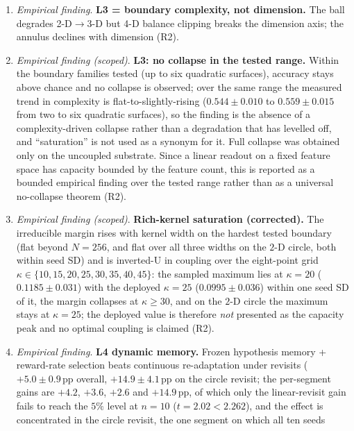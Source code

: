 \documentclass[preprint,12pt]{elsarticle}
\begin{document}
\begin{enumerate}[label=\arabic*.]
\texttt{data/s53\_auto\_basis\_v1.json} (top-$50$ PCA ridge on raw block-mean
features, $240$-block windows refitted every $20$ blocks, $\lambda=1.0$,
$n=2550$ readings per substrate over $10$ seeds and three arms), which closes
the traceability gap between that number and the script that produces it.
\item \emph{Empirical finding}. \textbf{L3 = boundary complexity, not dimension.} The ball degrades
2-D$\to$3-D but 4-D balance clipping breaks the dimension axis; the annulus
declines with dimension (R2).
\item \emph{Empirical finding (scoped)}. \textbf{L3: no collapse in the tested range.}
Within the boundary families tested (up to six quadratic surfaces),
accuracy stays above chance and no collapse is observed; over the same range
the measured trend in complexity is flat-to-slightly-rising ($0.544\pm0.010$
to $0.559\pm0.015$ from two to six quadratic surfaces), so the finding is the
absence of a complexity-driven collapse rather than a degradation that has
levelled off, and ``saturation'' is not used as a synonym for it. Full collapse
was obtained only on the uncoupled substrate. Since a linear readout on a
fixed feature space has capacity bounded by the feature count, this is
reported as a bounded empirical finding over the tested range rather than as
a universal no-collapse theorem (R2).
\item \emph{Empirical finding (scoped)}. \textbf{Rich-kernel saturation (corrected).} The irreducible margin
rises with kernel width on the hardest tested boundary (flat beyond
$N=256$, and flat over all three widths on the $2$-D circle, both within seed
SD) and is
inverted-U in coupling over the eight-point grid
$\kappa\in\{10,15,20,25,30,35,40,45\}$: the sampled maximum lies at
$\kappa=20$ ($0.1185\pm0.031$) with the deployed $\kappa=25$
($0.0995\pm0.036$) within one seed SD of it, the margin collapses at
$\kappa\geq30$, and on the $2$-D circle the maximum stays at $\kappa=25$;
the deployed value is therefore \emph{not} presented as the capacity peak and
no optimal coupling is claimed (R2).
\item \emph{Empirical finding}. \textbf{L4 dynamic memory.} Frozen hypothesis memory + reward-rate
selection beats continuous re-adaptation under revisits ($+5.0\pm0.9$\,pp
overall, $+14.9\pm4.1$\,pp on the circle revisit; the per-segment gains are
$+4.2$, $+3.6$, $+2.6$ and $+14.9$\,pp, of which only the linear-revisit gain
fails to reach the $5\%$ level at $n=10$ ($t=2.02<2.262$), and the effect is
concentrated in the circle revisit, the one segment on which all ten seeds

\end{enumerate}
\end{document}
